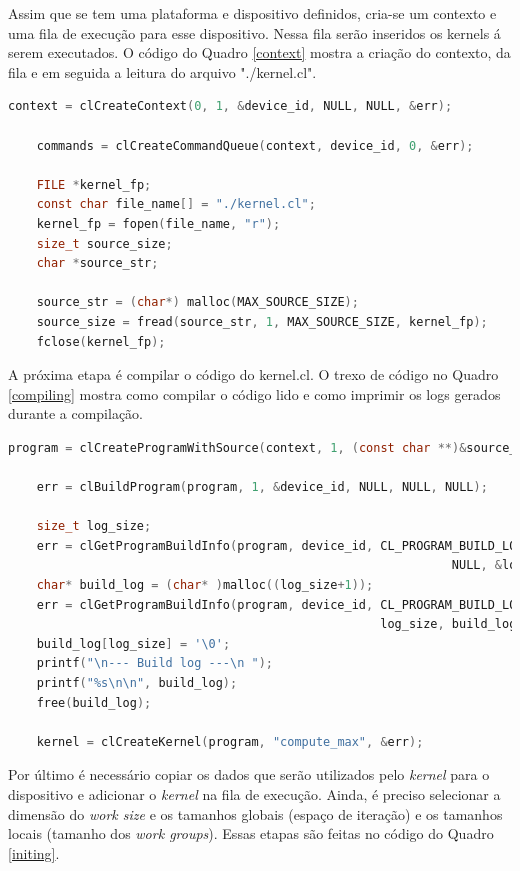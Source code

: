 \documentclass[12pt]{article}
\begin{document}
Assim que se tem uma plataforma e dispositivo definidos, cria-se um contexto e uma fila de execução para esse dispositivo. Nessa fila serão inseridos os kernels á serem executados. O código do Quadro \ref{context} mostra a criação do contexto, da fila e em seguida a leitura do arquivo "./kernel.cl".\\

\begin{lstlisting}[language=c, caption=Criação do contexto\, da fila de comandos e leitura do kernel.cl., label=context]
    context = clCreateContext(0, 1, &device_id, NULL, NULL, &err);

    commands = clCreateCommandQueue(context, device_id, 0, &err);

    FILE *kernel_fp;
    const char file_name[] = "./kernel.cl";
    kernel_fp = fopen(file_name, "r");
    size_t source_size;
    char *source_str;

    source_str = (char*) malloc(MAX_SOURCE_SIZE);
    source_size = fread(source_str, 1, MAX_SOURCE_SIZE, kernel_fp);
    fclose(kernel_fp);
\end{lstlisting}

A próxima etapa é compilar o código do kernel.cl. O trexo de código no Quadro \ref{compiling} mostra como compilar o código lido e como imprimir os logs gerados durante a compilação.\\

\begin{lstlisting}[language=c, caption=Compilando o kernel.cl., label=compiling]
    program = clCreateProgramWithSource(context, 1, (const char **)&source_str, (const size_t *)&source_size, &err);

    err = clBuildProgram(program, 1, &device_id, NULL, NULL, NULL);

    size_t log_size;
    err = clGetProgramBuildInfo(program, device_id, CL_PROGRAM_BUILD_LOG, 0, 
                                                              NULL, &log_size);
    char* build_log = (char* )malloc((log_size+1));
    err = clGetProgramBuildInfo(program, device_id, CL_PROGRAM_BUILD_LOG, 
                                                    log_size, build_log, NULL);
    build_log[log_size] = '\0';
    printf("\n--- Build log ---\n ");
    printf("%s\n\n", build_log);
    free(build_log);

    kernel = clCreateKernel(program, "compute_max", &err);
\end{lstlisting}

Por último é necessário copiar os dados que serão utilizados pelo \textit{kernel} para o dispositivo e adicionar o \textit{kernel} na fila de execução. Ainda, é preciso selecionar a dimensão do \textit{work size} e os tamanhos globais (espaço de iteração) e os tamanhos locais (tamanho dos \textit{work groups}). Essas etapas são feitas no código do Quadro \ref{initing}.\\ 
\end{document}
